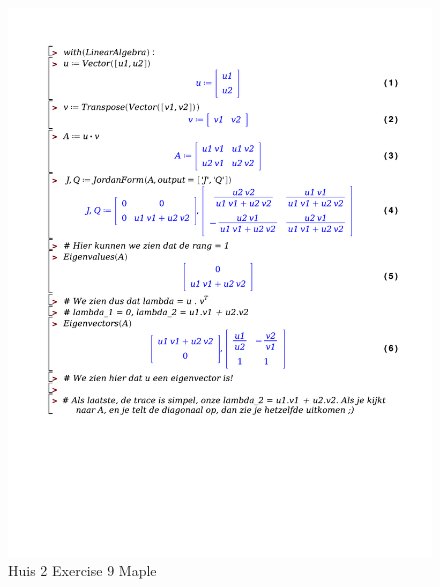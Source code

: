 \documentclass[a4paper]{article}
\begin{document}
\begin{figure}[!htbp]
	\centering
	\includegraphics[width=\textwidth]{exercises/huis_2_ex_9.pdf}
	\caption{Huis 2 Exercise 9 Maple}
	\label{fig:huis_2_ex_9_maple}
\end{figure}
\end{document}
